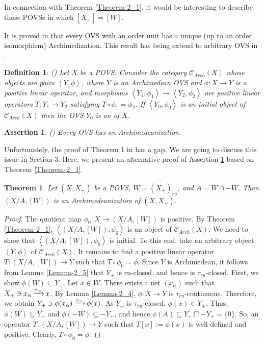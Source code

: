 \documentclass[10pt]{article}
\newtheorem{theorem}{Theorem}[section]
\newtheorem{assertion}{Assertion}[section]
\newtheorem{definition}{Definition}[section]
\DeclareMathOperator{\convtaur}{\xrightarrow[]{\tau_{{\it ru}}}}
\renewcommand{\a}{\alpha}
\begin{document}
\noindent
In connection with Theorem \ref{Theorem-2_1}, it would be interesting to describe those POVSs in which $[X_+]=[W]$.

\medskip
It is proved in \cite{PT-2009} that every OVS with an order unit has a unique (up to an order isomor\-phism) Archimedi\-za\-tion.
This result has being extend to arbitrary OVS in \cite{E-2017}. 

\begin{definition}\label{Definition-2_2}
{\rm (\cite[Definition 5]{E-2017})}
Let $X$ be a POVS. Consider the category $\mathcal{C}_{Arch}(X)$ whose objects are pairs $\left\langle Y,\phi\right\rangle$,
where $Y$ is an Archimedean OVS and $\phi:X\to Y$ is a positive linear operator, and morphisms
$\left\langle Y_1,\phi_1\right\rangle\to\left\langle Y_2,\phi_2\right\rangle$ are positive linear operators $T: Y_1\to Y_2$ satisfying
$T\circ \phi_1=\phi_2$. If $\left\langle Y_0,\phi_0\right\rangle$ is an initial object of $\mathcal{C}_{Arch}(X)$ 
then the OVS $Y_0$ is an {\color{blue}{Archimedeanization}} of $X$.
\end{definition}

\begin{assertion}\label{Assertion-2_3}
{\em (\cite[Theorem 1]{E-2017})}
Every OVS has an Archimedeanization.
\end{assertion}

\noindent
Unfortunately, the proof of Theorem 1 in \cite{E-2017} has a gap. We are going to discuss this issue in Section 3.
Here, we present an alternative proof of Assertion \ref{Assertion-2_3} based on Theorem \ref{Theorem-2_1}.

\begin{theorem}\label{Theorem-2_2}
Let $(X,X_+)$ be a POVS, $W=\overline{(X_+)}_{ru}$, and $A=W\cap -W$. Then $(X/A,[W])$ is an Archimedeanization of $(X,X_+)$.
\end{theorem}

\begin{proof}
The quotient map $\phi_0:X\to(X/A,[W])$ is positive. By Theorem \ref{Theorem-2_1}, 
$\left\langle(X/A,[W]),\phi_0\right\rangle$ is an object of $\mathcal{C}_{Arch}(X)$.
We need to show that $\left\langle(X/A,[W]),\phi_0\right\rangle$ is initial. To this end, take an arbitrary 
object $\left\langle Y,\phi\right\rangle$ of $\mathcal{C}_{Arch}(X)$. It remains to find a positive linear operator
$T:(X/A,[W])\to Y$ such that $T\circ\phi_0=\phi$. Since $Y$ is Archimedean,
it follows from Lemma \ref{Lemma-2_5} that $Y_+$ is ru-closed, and hence is $\tau_{ru}$-closed.
First, we show $\phi(W)\subseteq Y_+$. Let $x\in W$. There exists a net $(x_{\a})$ such that 
$X_+\ni x_{\a}\convtaur x$. By Lemma \ref{Lemma-2_4}, $\phi:X\to Y$ is $\tau_{ru}$-continuous. Therefore, we obtain 
$Y_+\ni\phi(x_{\a})\convtaur\phi(x)$. As $Y_+$ is $\tau_{ru}$-closed, $\phi(x)\in Y_+$. 
Thus, $\phi(W)\subseteq Y_+$ and $\phi(-W)\subseteq -Y_+$, and hence $\phi(A)\subseteq Y_+\bigcap-Y_+=\{0\}$. 
So, an operator $T:(X/A,[W])\to Y$ such that $T[x]:=\phi(x)$ is well defined and positive. Clearly, $T\circ\phi_0=\phi$. 
\end{proof}
\end{document}
